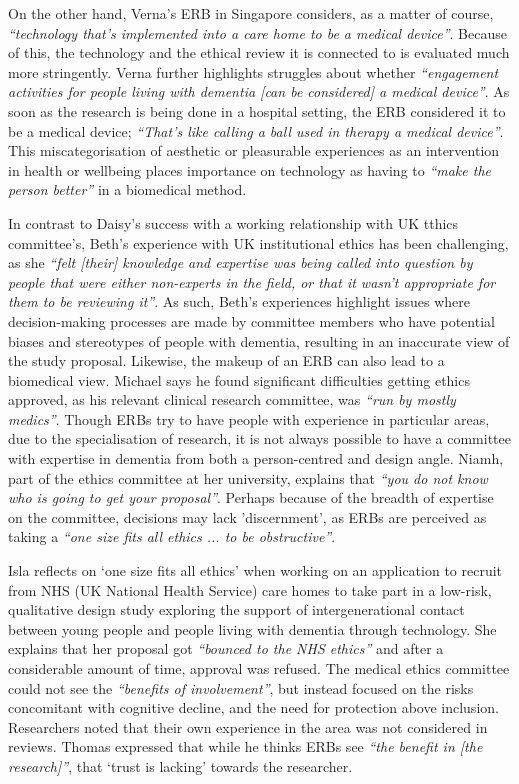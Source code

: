 On the other hand, Verna’s ERB in Singapore considers, as a matter of course, \textit{``technology that’s implemented into a care home to be a medical device''}. Because of this, the technology and the ethical review it is connected to is evaluated much more stringently. Verna further highlights struggles about whether \textit{``engagement activities for people living with dementia [can be considered] a medical device''}. As soon as the research is being done in a hospital setting, the ERB considered it to be a medical device; \textit{``That’s like calling a ball used in therapy a medical device''}. This miscategorisation of aesthetic or pleasurable experiences as an intervention in health or wellbeing places importance on technology as having to \textit{``make the person better''} in a biomedical method.

In contrast to Daisy’s success with a working relationship with UK tthics committee’s, Beth’s experience with UK institutional ethics has been challenging, as she \textit{``felt [their] knowledge and expertise was being called into question by people that were either non-experts in the field, or that it wasn’t appropriate for them to be reviewing it''}. As such, Beth’s experiences highlight issues where decision-making processes are made by committee members who have potential biases and stereotypes of people with dementia, resulting in an inaccurate view of the study proposal. Likewise, the makeup of an ERB can also lead to a biomedical view. Michael says he found significant difficulties getting ethics approved, as his relevant clinical research committee, was \textit{``run by mostly medics''}. Though ERBs try to have people with experience in particular areas, due to the specialisation of research, it is not always possible to have a committee with expertise in dementia from both a person-centred and design angle. Niamh, part of the ethics committee at her university, explains that \textit{``you do not know who is going to get your proposal''}. Perhaps because of the breadth of expertise on the committee, decisions may lack 'discernment', as ERBs are perceived as taking a \textit{``one size fits all ethics ... to be obstructive''}. 

Isla reflects on `one size fits all ethics' when working on an application to recruit from NHS (UK National Health Service) care homes to take part in a low-risk, qualitative design study exploring the support of intergenerational contact between young people and people living with dementia through technology. She explains that her proposal got \textit{``bounced to the NHS ethics''} and after a considerable amount of time, approval was refused. The medical ethics committee could not see the \textit{``benefits of involvement''}, but instead focused on the risks concomitant with cognitive decline, and the need for protection above inclusion. Researchers noted that their own experience in the area was not considered in reviews. Thomas expressed that while he thinks ERBs see \textit{``the benefit in [the research]''}, that `trust is lacking' towards the researcher. 

